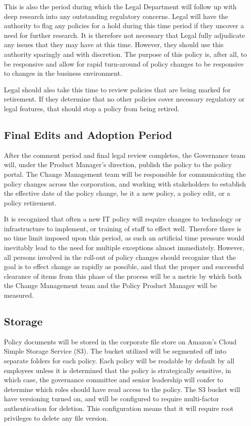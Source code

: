 \documentclass[stu]{apa7}
\begin{document}
This is also the period during which the Legal Department will follow up with deep research into any outstanding regulatory concerns. Legal will have the authority to flag any policies for a hold during this time period if they uncover a need for further research. It is therefore not necessary that Legal fully adjudicate any issues that they may have at this time. However, they should use this authority sparingly and with discretion. The purpose of this policy is, after all, to be responsive and allow for rapid turn-around of policy changes to be responsive to changes in the business environment.

Legal should also take this time to review policies that are being marked for retirement. If they determine that no other policies cover necessary regulatory or legal features, that should stop a policy from being retired.

\subsection{Final Edits and Adoption Period}
\label{sec:org3e7cc8c}

After the comment period and final legal review completes, the Governance team will, under the Product Manager's direction, publish the policy to the policy portal. The Change Management team will be responsible for communicating the policy changes across the corporation, and working with stakeholders to establish the effective date of the policy change, be it a new policy, a policy edit, or a policy retirement.

It is recognized that often a new IT policy will require changes to technology or infrastructure to implement, or training of staff to effect well. Therefore there is no time limit imposed upon this period, as such an artificial time pressure would inevitably lead to the need for multiple exceptions almost immediately. However, all persons involved in the roll-out of policy changes should recognize that the goal is to effect change as rapidly as possible, and that the proper and successful clearance of items from this phase of the process will be a metric by which both the Change Management team and the Policy Product Manager will be measured.

\subsection{Storage}
\label{sec:orga4eeb72}

Policy documents will be stored in the corporate file store on Amazon's Cloud Simple Storage Service (S3). The bucket utilized will be segmented off into separate folders for each policy. Each policy will be readable by default by all employees unless it is determined that the policy is strategically sensitive, in which case, the governance committee and senior leadership will confer to determine which roles should have read access to the policy. The S3 bucket will have versioning turned on, and will be configured to require multi-factor authentication for deletion. This configuration means that it will require root privileges to delete any file version.
\end{document}
